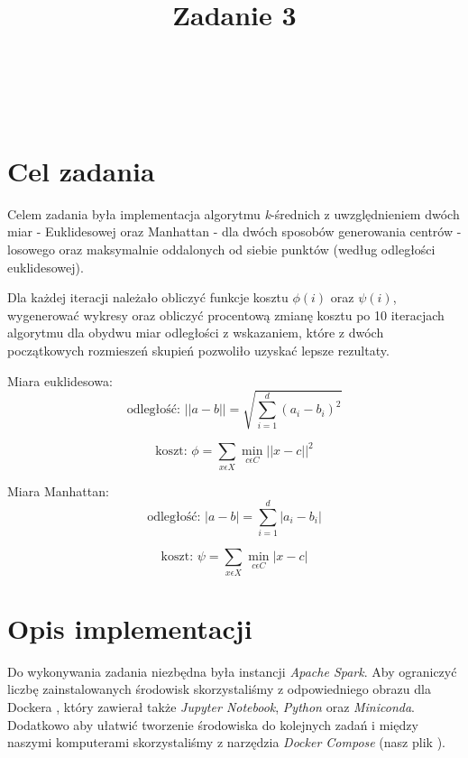 \documentclass{classrep}
\author{%
\\
  \studentinfo[234128@edu.p.lodz.pl]{Piotr Wardęcki}{234128}\\
  \studentinfo[234053@edu.p.lodz.pl]{Paweł Galewicz}{234053}\\
  \studentinfo[234067@edu.p.lodz.pl]{Bartosz Jurczewski}{234067}%
}
\title{Zadanie 3}
\begin{document}
\maketitle
\thispagestyle{fancyplain}
\clearpage

\section{Cel zadania}

Celem zadania była implementacja algorytmu \textit{k}-średnich z uwzględnieniem dwóch miar - Euklidesowej oraz Manhattan - dla dwóch sposobów generowania centrów - losowego oraz maksymalnie oddalonych od siebie punktów (według odległości euklidesowej). 

Dla każdej iteracji należało obliczyć funkcje kosztu $\phi(i)$ oraz $\psi(i)$, wygenerować wykresy oraz obliczyć procentową zmianę kosztu po 10 iteracjach algorytmu dla obydwu miar odległości z wskazaniem, które z dwóch początkowych rozmieszeń skupień pozwoliło uzyskać lepsze rezultaty.

Miara euklidesowa:
\begin{equation}
    \text{odległość:  } || a - b || = \sqrt{\sum_{i=1}^{d} (a_{i} - b_{i}) ^ 2 }
\end{equation}

\begin{equation}
    \text{koszt:  } \phi = \sum_{x \epsilon X} \min_{c \epsilon C} || x - c || ^ 2
\end{equation}

Miara Manhattan:
\begin{equation}
    \text{odległość:  } | a - b | = \sum_{i=1}^{d} | a_{i} - b_{i} |
\end{equation}

\begin{equation}
    \text{koszt:  } \psi =  \sum_{x \epsilon X} \min_{c \epsilon C} | x - c |
\end{equation}

\section{Opis implementacji}
Do wykonywania zadania niezbędna była instancji \textit{Apache Spark}. Aby ograniczyć liczbę zainstalowanych środowisk skorzystaliśmy z odpowiedniego obrazu dla Dockera \cite{docker}, który zawierał także \textit{Jupyter Notebook}, \textit{Python} oraz \textit{Miniconda}. Dodatkowo aby ułatwić tworzenie środowiska do kolejnych zadań i między naszymi komputerami skorzystaliśmy z narzędzia \textit{Docker Compose} (nasz plik \cite{docker-compose}).
\end{document}
